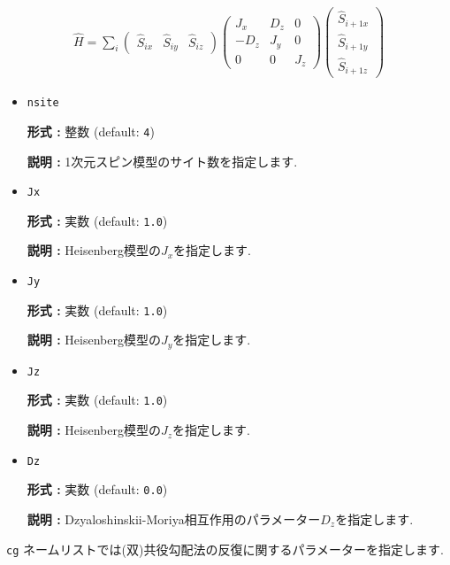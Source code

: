 \documentclass[12pt,titlepage]{jarticle}
\begin{document}
\begin{align}
  {\hat H} = \sum_{i}
  \left(
  \begin{matrix}
    {\hat S}_{i x} & {\hat S}_{i y} & {\hat S}_{i z}
  \end{matrix}
  \right)
  \left(
  \begin{matrix}
    J_x & D_z & 0 \\
    -D_z & J_y & 0 \\
    0 & 0 & J_z
  \end{matrix}
  \right)
  \left(
  \begin{matrix}
    {\hat S}_{i+1 x} \\ {\hat S}_{i+1 y} \\ {\hat S}_{i+1 z}
  \end{matrix}
  \right)
\end{align}

\begin{itemize}

\item  \verb|nsite|
  
  {\bf 形式 :} 整数 (default: \verb|4|)

  {\bf 説明 :} 1次元スピン模型のサイト数を指定します.
  
\item  \verb|Jx|
  
  {\bf 形式 :} 実数 (default: \verb|1.0|)

  {\bf 説明 :} Heisenberg模型の$J_x$を指定します.

\item  \verb|Jy|
  
  {\bf 形式 :} 実数 (default: \verb|1.0|)

  {\bf 説明 :} Heisenberg模型の$J_y$を指定します.

\item  \verb|Jz|
  
  {\bf 形式 :} 実数 (default: \verb|1.0|)

  {\bf 説明 :} Heisenberg模型の$J_z$を指定します.

\item  \verb|Dz|
  
  {\bf 形式 :} 実数 (default: \verb|0.0|)

  {\bf 説明 :} Dzyaloshinskii-Moriya相互作用のパラメーター$D_z$を指定します.

\end{itemize}

\verb|cg| ネームリストでは(双)共役勾配法の反復に関するパラメーターを指定します.
\end{document}

